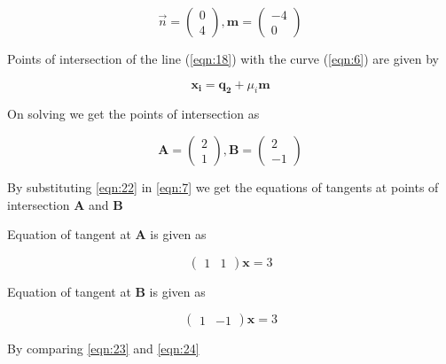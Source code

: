 \documentclass[journal,10pt,twocolumn]{article}
\let\vec\mathbf
\newcommand{\myvec}[1]{\ensuremath{\begin{pmatrix}#1\end{pmatrix}}}
\begin{document}
    \begin{equation}
    \label{eqn:20}
        \Vec{n} = \myvec{0 \\ 4} , \vec{m} = \myvec{-4 \\ 0}
    \end{equation}
    
    \begin{flushleft}
        Points of intersection of the line (\eqref{eqn:18}) with the curve (\eqref{eqn:6}) are given by
    \end{flushleft}
    
    \begin{equation}
    \label{eqn:21}
        \vec{x_i} = \vec{q_2} + \mu_i\vec{m}
    \end{equation}
    
    \begin{flushleft}
        On solving we get the points of intersection as
    \end{flushleft}
    
    \begin{equation}
    \label{eqn:22}
        \vec{A} = \myvec{2 \\ 1} , \vec{B} = \myvec{2 \\ -1}
    \end{equation}
    
    \begin{flushleft}
        By substituting \eqref{eqn:22} in \eqref{eqn:7} we get the equations of tangents at points of intersection $\vec{A}$ and $\vec{B}$
    \end{flushleft}
    
    \begin{flushleft}
        Equation of tangent at $\vec{A}$ is given as
    \end{flushleft}
    
    \begin{equation}
    \label{eqn:23}
        \myvec{1 & 1}\vec{x} = 3
    \end{equation}
    
    \begin{flushleft}
        Equation of tangent at $\vec{B}$ is given as
    \end{flushleft}
        
    \begin{equation}
    \label{eqn:24}
        \myvec{1 & -1}\vec{x} = 3
    \end{equation}
    
    \begin{flushleft}
        By comparing \eqref{eqn:23} and \eqref{eqn:24}
    \end{flushleft}
    
\end{document}
